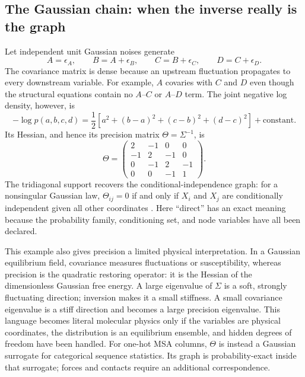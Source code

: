 \subsection{The Gaussian chain: when the inverse really is the graph}

Let independent unit Gaussian noises generate
\begin{equation}
A=\epsilon_A,\qquad B=A+\epsilon_B,\qquad
C=B+\epsilon_C,\qquad D=C+\epsilon_D.
\label{eq:gaussian-four-chain}
\end{equation}
The covariance matrix is dense because an upstream fluctuation propagates to every downstream
variable.  For example, $A$ covaries with $C$ and $D$ even though the structural equations contain
no $A$--$C$ or $A$--$D$ term.  The joint negative log density, however, is
\begin{equation}
-\log p(a,b,c,d)=\frac12\left[a^2+(b-a)^2+(c-b)^2+(d-c)^2\right]+\text{constant}.
\end{equation}
Its Hessian, and hence its precision matrix $\Theta=\Sigma^{-1}$, is
\begin{equation}
\Theta=
\begin{pmatrix}
2&-1&0&0\\
-1&2&-1&0\\
0&-1&2&-1\\
0&0&-1&1
\end{pmatrix}.
\label{eq:gaussian-four-chain-precision}
\end{equation}
The tridiagonal support recovers the conditional-independence graph: for a nonsingular Gaussian
law, $\Theta_{ij}=0$ if and only if $X_i$ and $X_j$ are conditionally independent given all other
coordinates \cite{dempster1972}.  Here ``direct'' has an exact meaning because the probability
family, conditioning set, and node variables have all been declared.

This example also gives precision a limited physical interpretation.  In a Gaussian equilibrium
field, covariance measures fluctuations or susceptibility, whereas precision is the quadratic
restoring operator: it is the Hessian of the dimensionless Gaussian free energy.  A large
eigenvalue of $\Sigma$ is a soft, strongly fluctuating direction; inversion makes it a small
stiffness.  A small covariance eigenvalue is a stiff direction and becomes a large precision
eigenvalue.  This language becomes literal molecular physics only if the variables are physical
coordinates, the distribution is an equilibrium ensemble, and hidden degrees of freedom have
been handled.  For one-hot MSA columns, $\Theta$ is instead a Gaussian surrogate for categorical
sequence statistics.  Its graph is probability-exact inside that surrogate; forces and contacts
require an additional correspondence.

